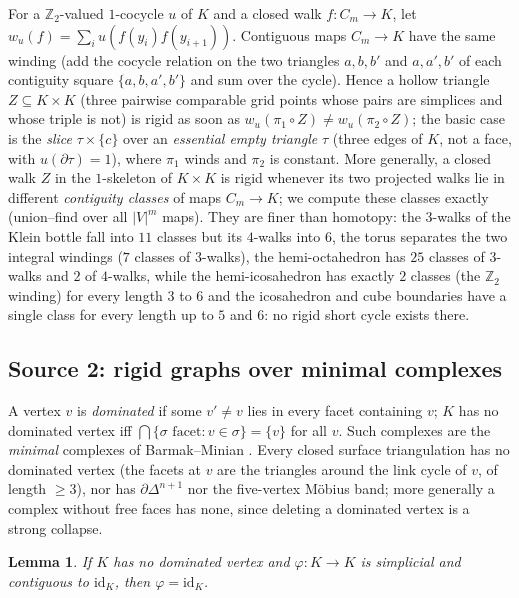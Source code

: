 \documentclass[12pt]{article}
\newcommand{\Zt}{\mathbb{Z}_2}
\newtheorem{lemma}[theo]{Lemma}
\begin{document}
For a $\Zt$-valued $1$-cocycle $u$ of $K$ and a closed walk $f:C_m\to K$,
let $w_u(f)=\sum_i u(f(y_i)f(y_{i+1}))$.  Contiguous maps $C_m\to K$ have the
same winding (add the cocycle relation on the two triangles $a,b,b'$ and
$a,a',b'$ of each contiguity square $\{a,b,a',b'\}$ and sum over the cycle).
Hence a hollow triangle $Z\subseteq K\times K$ (three pairwise comparable
grid points whose pairs are simplices and whose triple is not) is rigid as
soon as $w_u(\pi_1\circ Z)\ne w_u(\pi_2\circ Z)$; the basic case is the
\emph{slice} $\tau\times\{c\}$ over an \emph{essential empty triangle}
$\tau$ (three edges of $K$, not a face, with $u(\partial\tau)=1$), where
$\pi_1$ winds and $\pi_2$ is constant.  More generally, a closed walk
$Z$ in the $1$-skeleton of $K\times K$ is rigid whenever its two projected
walks lie in different \emph{contiguity classes} of maps $C_m\to K$; we
compute these classes exactly (union--find over all $|V|^m$ maps).  They
are finer than homotopy: the $3$-walks of the Klein bottle fall into $11$
classes but its $4$-walks into $6$, the torus separates the two integral
windings ($7$ classes of $3$-walks), the hemi-octahedron has $25$ classes of
$3$-walks and $2$ of $4$-walks, while the hemi-icosahedron has exactly $2$
classes (the $\Zt$ winding) for every length $3$ to $6$ and the icosahedron
and cube boundaries have a single class for every length up to $5$ and $6$:
no rigid short cycle exists there.

\subsection{Source 2: rigid graphs over minimal complexes}

A vertex $v$ is \emph{dominated} if some $v'\ne v$ lies in every facet
containing $v$; $K$ has no dominated vertex iff
$\bigcap\{\sigma\text{ facet}:v\in\sigma\}=\{v\}$ for all $v$.  Such
complexes are the \emph{minimal} complexes of Barmak--Minian \cite{BM12}.
Every closed surface triangulation has no dominated vertex (the facets at $v$
are the triangles around the link cycle of $v$, of length $\ge3$), nor has
$\partial\Delta^{n+1}$ nor the five-vertex M\"obius band; more generally a
complex without free faces has none, since deleting a dominated vertex is a
strong collapse.

\begin{lemma}\label{lem:idalone}
If $K$ has no dominated vertex and $\varphi:K\to K$ is simplicial and
contiguous to $\mathrm{id}_K$, then $\varphi=\mathrm{id}_K$.
\end{lemma}
\end{document}
